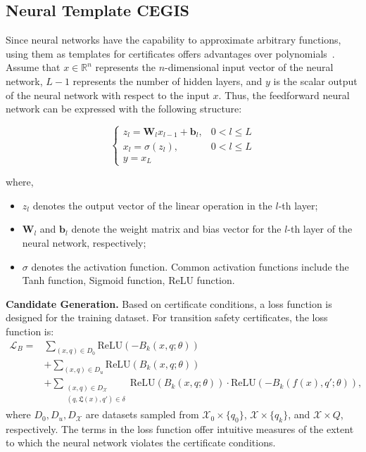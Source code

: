 \subsection{Neural Template CEGIS}
Since neural networks have the capability to approximate arbitrary functions, using them as templates for certificates offers advantages over polynomials~\cite{zhao2020synthesizing}. Assume that $x \in \mathbb{R}^n$ represents the $n$-dimensional input vector of the neural network, $L-1$ represents the number of hidden layers, and $y$ is the scalar output of the neural network with respect to the input $x$. Thus, the feedforward neural network can be expressed with the following structure:

\[
\begin{cases}
z_l = \mathbf{W}_l x_{l-1} + \mathbf{b}_l, & 0 < l \leqslant L \\
x_l = \sigma(z_l), & 0 < l \leqslant L \\
y = x_L
\end{cases}
\tag{5}
\]

where,
\begin{itemize}
    \item $z_l$ denotes the output vector of the linear operation in the $l$-th layer;
    \item $\mathbf{W}_l$ and $\mathbf{b}_l$ denote the weight matrix and bias vector for the $l$-th layer of the neural network, respectively;
    \item $\sigma$ denotes the activation function. Common activation functions include the Tanh function, Sigmoid function, ReLU function.
\end{itemize}

\textbf{Candidate Generation.} Based on certificate conditions, a loss function is designed for the training dataset. For transition safety certificates, the loss function is:
\begin{align}
\mathcal{L}_B = &\sum_{(x,q) \in D_0} \text{ReLU}(-B_k(x, q; \theta)) \nonumber \\ 
&+ \sum_{(x,q) \in D_u} \text{ReLU}(B_k(x, q; \theta)) \nonumber \\ 
&+ \sum_{\substack{(x,q) \in D_{\mathcal{X}} \\ (q, \mathfrak{L}(x), q') \in \delta}} \text{ReLU}(B_k(x, q; \theta)) \cdot \text{ReLU}(-B_k(f(x), q'; \theta)),
\end{align}
where $D_0, D_u, D_{\mathcal{X}}$ are datasets sampled from $\mathcal{X}_0 \times \{q_0\}$, $\mathcal{X} \times \{q_k\}$, and $\mathcal{X} \times Q$, respectively. The terms in the loss function offer intuitive measures of the extent to which the neural network violates the certificate conditions.

